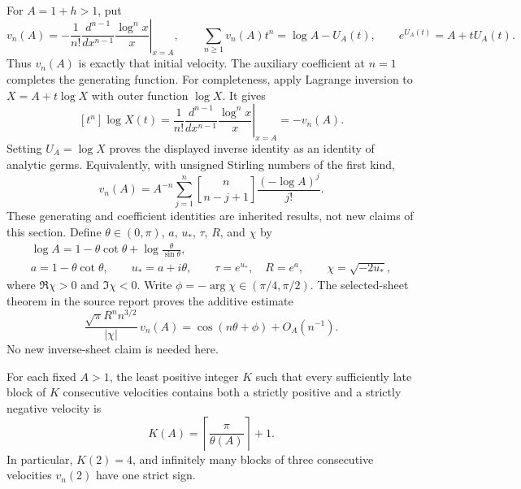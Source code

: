 For $A=1+h>1$, put
\[
 v_n(A)=-\frac1{n!}\left.\frac{d^{n-1}}{dx^{n-1}}
               \frac{\log^n x}{x}\right|_{x=A},
 \qquad
 \sum_{n\geq1}v_n(A)t^n=\log A-U_A(t),
 \qquad e^{U_A(t)}=A+tU_A(t).
\]
Thus $v_n(A)$ is exactly that initial velocity.  The auxiliary
coefficient at $n=1$ completes the generating function.  For completeness,
apply Lagrange inversion \cite{Gessel} to $X=A+t\log X$ with outer function
$\log X$.  It gives
\[
 [t^n]\log X(t)=\frac1{n!}
       \left.\frac{d^{n-1}}{dx^{n-1}}
                \frac{\log^n x}{x}\right|_{x=A}=-v_n(A).
\]
Setting $U_A=\log X$ proves the displayed inverse identity as an
identity of analytic germs.  Equivalently, with unsigned Stirling
numbers of the first kind,
\[
 v_n(A)=A^{-n}\sum_{j=1}^n
             \genfrac{[}{]}{0pt}{}{n}{n-j+1}\frac{(-\log A)^j}{j!}.
\]
These generating and coefficient identities are inherited results,
not new claims of this section.  Define $\theta\in(0,\pi)$, $a$, $u_*$,
$\tau$, $R$, and $\chi$ by
\begin{gather*}
 \log A=1-\theta\cot\theta+
       \log\frac{\theta}{\sin\theta},\\
 a=1-\theta\cot\theta,
 \qquad u_*=a+i\theta,
 \qquad \tau=e^{u_*},\quad R=e^a,
 \qquad \chi=\sqrt{-2u_*},
\end{gather*}
where $\Re\chi>0$ and $\Im\chi<0$.  Write
$\phi=-\arg\chi\in(\pi/4,\pi/2)$.  The selected-sheet theorem in
the source report proves the additive estimate
\begin{equation}\label{newdiag:eq:cosine}
 \frac{\sqrt\pi R^n n^{3/2}}{|\chi|}\,v_n(A)
       =\cos(n\theta+\phi)+O_A(n^{-1}).
\end{equation}
No new inverse-sheet claim is needed here.

\begin{theorem}
\label{newdiag:thm:sharp-block}
For each fixed $A>1$, the least positive integer $K$ such that every
sufficiently late block of $K$ consecutive velocities contains both a
strictly positive and a strictly negative velocity is
\begin{equation}\label{newdiag:eq:sharp-K}
 K(A)=\left\lceil\frac\pi{\theta(A)}\right\rceil+1.
\end{equation}
In particular, $K(2)=4$, and infinitely many blocks of three
consecutive velocities $v_n(2)$ have one strict sign.
\end{theorem}

